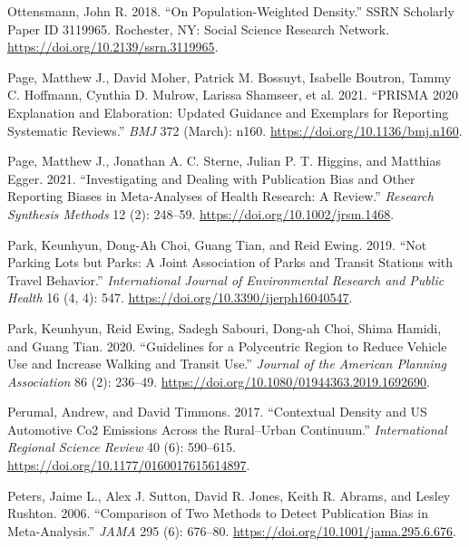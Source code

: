 \documentclass[
  11pt,
  openany]{memoir}
\newlength{\cslhangindent}
\newlength{\cslentryspacingunit} %
\newenvironment{CSLReferences}[2] %
 {%
  \setlength{\parindent}{0pt}
  \ifodd #1
  \let\oldpar\par
  \def\par{\hangindent=\cslhangindent\oldpar}
  \fi
  \setlength{\parskip}{#2\cslentryspacingunit}
 }%
 {}
\begin{document}
\begin{CSLReferences}{1}{0}
\leavevmode{}%
Ottensmann, John R. 2018. {``On {Population}-{Weighted Density}.''} SSRN Scholarly Paper ID 3119965. {Rochester, NY}: {Social Science Research Network}. \url{https://doi.org/10.2139/ssrn.3119965}.

\leavevmode{}%
Page, Matthew J., David Moher, Patrick M. Bossuyt, Isabelle Boutron, Tammy C. Hoffmann, Cynthia D. Mulrow, Larissa Shamseer, et al. 2021. {``{PRISMA} 2020 Explanation and Elaboration: Updated Guidance and Exemplars for Reporting Systematic Reviews.''} \emph{BMJ} 372 (March): n160. \url{https://doi.org/10.1136/bmj.n160}.

\leavevmode{}%
Page, Matthew J., Jonathan A. C. Sterne, Julian P. T. Higgins, and Matthias Egger. 2021. {``Investigating and Dealing with Publication Bias and Other Reporting Biases in Meta-Analyses of Health Research: A Review.''} \emph{Research Synthesis Methods} 12 (2): 248--59. \url{https://doi.org/10.1002/jrsm.1468}.

\leavevmode{}%
Park, Keunhyun, Dong-Ah Choi, Guang Tian, and Reid Ewing. 2019. {``Not {Parking Lots} but {Parks}: A {Joint Association} of {Parks} and {Transit Stations} with {Travel Behavior}.''} \emph{International Journal of Environmental Research and Public Health} 16 (4, 4): 547. \url{https://doi.org/10.3390/ijerph16040547}.

\leavevmode{}%
Park, Keunhyun, Reid Ewing, Sadegh Sabouri, Dong-ah Choi, Shima Hamidi, and Guang Tian. 2020. {``Guidelines for a {Polycentric Region} to {Reduce Vehicle Use} and {Increase Walking} and {Transit Use}.''} \emph{Journal of the American Planning Association} 86 (2): 236--49. \url{https://doi.org/10.1080/01944363.2019.1692690}.

\leavevmode{}%
Perumal, Andrew, and David Timmons. 2017. {``Contextual {Density} and {US Automotive Co2 Emissions} Across the {Rural}--{Urban Continuum}.''} \emph{International Regional Science Review} 40 (6): 590--615. \url{https://doi.org/10.1177/0160017615614897}.

\leavevmode{}%
Peters, Jaime L., Alex J. Sutton, David R. Jones, Keith R. Abrams, and Lesley Rushton. 2006. {``Comparison of {Two Methods} to {Detect Publication Bias} in {Meta}-Analysis.''} \emph{JAMA} 295 (6): 676--80. \url{https://doi.org/10.1001/jama.295.6.676}.


\end{CSLReferences}
\end{document}
